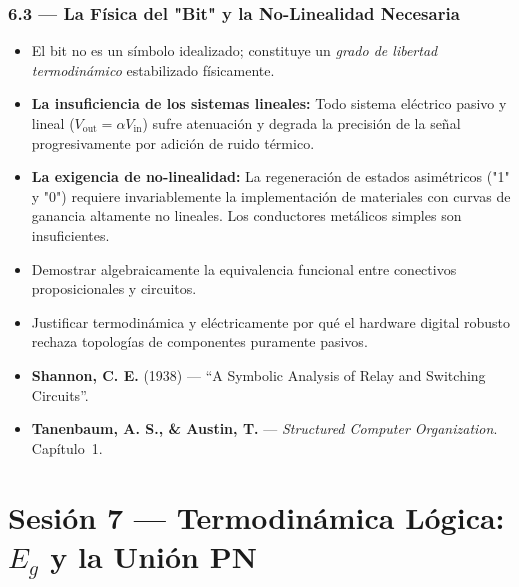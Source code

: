 \documentclass[11pt, letterpaper]{article}
\begin{document}
\subsubsection{6.3 --- La F\'isica del "Bit" y la No-Linealidad Necesaria}
\begin{itemize}
  \item El bit no es un s\'imbolo idealizado; constituye un \emph{grado de libertad termodin\'amico} estabilizado f\'isicamente.
  \item \textbf{La insuficiencia de los sistemas lineales:} Todo sistema el\'ectrico pasivo y lineal ($V_\text{out}=\alpha V_\text{in}$) sufre atenuaci\'on y degrada la precisi\'on de la se\~nal progresivamente por adici\'on de ruido t\'ermico.
  \item \textbf{La exigencia de no-linealidad:} La regeneraci\'on de estados asim\'etricos ("1" y "0") requiere invariablemente la implementaci\'on de materiales con curvas de ganancia altamente no lineales. Los conductores met\'alicos simples son insuficientes.
\end{itemize}

\begin{objetivos}
\begin{itemize}
  \item Demostrar algebraicamente la equivalencia funcional entre conectivos proposicionales y circuitos.
  \item Justificar termodin\'amica y el\'ectricamente por qu\'e el hardware digital robusto rechaza topolog\'ias de componentes puramente pasivos.
\end{itemize}
\end{objetivos}

\begin{lecturas}
\begin{itemize}
  \item[$(\star)$] \textbf{Shannon, C. E.} (1938) --- ``A Symbolic Analysis of Relay and Switching Circuits''.
  \item \textbf{Tanenbaum, A. S., \& Austin, T.} --- \emph{Structured Computer Organization}. Cap\'itulo~1.
\end{itemize}
\end{lecturas}

\newpage

\section{Sesi\'on 7 --- Termodin\'amica L\'ogica: $E_g$ y la Uni\'on PN}
\end{document}
